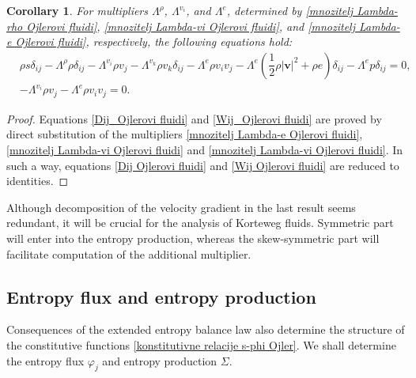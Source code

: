 \documentclass[a4paper,fleqn]{cas-sc}
\newtheorem{corollary}{Corollary}[section]
\theoremstyle{definition}
\begin{document}
\begin{corollary} \label{Cor:Dij Wij Ojlerovi fluidi}
	For multipliers $\Lambda^{\rho}$, $\Lambda^{v_i}$, and $\Lambda^{e}$, determined by \eqref{mnozitelj Lambda-rho Ojlerovi fluidi}, \eqref{mnozitelj Lambda-vi Ojlerovi fluidi}, and \eqref{mnozitelj Lambda-e Ojlerovi fluidi}, respectively, the following equations hold: 
	\begin{align} \label{Dij_Ojlerovi fluidi}
		& \rho s\delta_{ij} -\Lambda^\rho\rho\delta_{ij}-\Lambda^{v_i}\rho v_j-\Lambda^{v_k}\rho   
		v_k\delta_{ij} %
		-\Lambda^e\rho v_iv_j-\Lambda^ e\left(\dfrac{1}{2}\rho|\mathbf{v}|^2 
		+\rho e\right)\delta_{ij}-\Lambda^ e p\delta_{ij} = 0, 
		\\
		\label{Wij_Ojlerovi fluidi}
		& -\Lambda^{v_i}\rho v_j-\Lambda^{e}\rho v_i v_j = 0. 
	\end{align}
	
\end{corollary}
\begin{proof}
	Equations \eqref{Dij_Ojlerovi fluidi} and \eqref{Wij_Ojlerovi fluidi} are proved by direct substitution of the multipliers \eqref{mnozitelj Lambda-e Ojlerovi fluidi}, \eqref{mnozitelj Lambda-vi Ojlerovi fluidi} and \eqref{mnozitelj Lambda-vi Ojlerovi fluidi}. In such a way, equations \eqref{Dij Ojlerovi fluidi} and \eqref{Wij Ojlerovi fluidi} are reduced to identities. 
\end{proof}

Although decomposition of the velocity gradient in the last result seems redundant, it will be crucial for the analysis of Korteweg fluids. Symmetric part will enter into the entropy production, whereas the skew-symmetric part will facilitate computation of the additional multiplier. 

\subsection{Entropy flux and entropy production} 

Consequences of the extended entropy balance law also determine the structure of the constitutive functions \eqref{konstitutivne relacije s-phi Ojler}. We shall determine the entropy flux $\varphi_{j}$ and entropy production $\Sigma$. 
\end{document}
